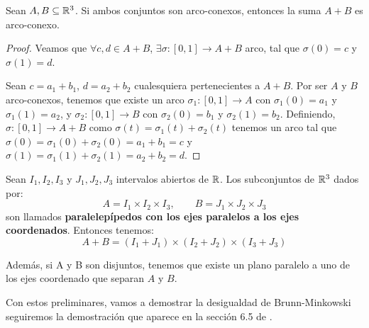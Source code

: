 \begin{lemma}
Sean $A,B \subseteq \mathbb{R}^3$. Si ambos conjuntos son arco-conexos, entonces la suma $A+B$ es arco-conexo.
\end{lemma}
\begin{proof}
Veamos que $\forall c,d \in A+B$, $\exists \sigma: [0,1] \longrightarrow A+B$ arco, tal que $\sigma(0)=c$ y $\sigma(1)=d$.

Sean $c=a_1 + b_1$, $d=a_2+b_2$ cualesquiera pertenecientes a $A+B$. Por ser $A$ y $B$ arco-conexos, tenemos que existe un arco $\sigma_1: [0,1] \longrightarrow A$ con $\sigma_1(0)=a_1$ y $\sigma_1(1)=a_2$, y $\sigma_2: [0,1] \longrightarrow B$ con $\sigma_2(0)=b_1$ y $\sigma_2(1)=b_2$. Definiendo, $\sigma: [0,1] \longrightarrow A+B$ como $\sigma(t) = \sigma_1(t) + \sigma_2(t)$ tenemos un arco tal que $\sigma(0)=\sigma_1(0) + \sigma_2(0) = a_1+b_1 = c$ y $\sigma(1)=\sigma_1(1) + \sigma_2(1) = a_2+b_2 = d$.
\end{proof}

\begin{lemma}\label{paralelepipedoslemma}
Sean $I_1, I_2, I_3$ y $J_1, J_2, J_3$ intervalos abiertos de $\mathbb{R}$. Los subconjuntos de $\mathbb{R}^3$ dados por:
%
\begin{equation*}
    A = I_1 \times I_2 \times I_3, \qquad B = J_1 \times J_2 \times J_3
\end{equation*}
%
son llamados \textbf{paralelepípedos con los ejes paralelos a los ejes coordenados}. Entonces tenemos:
%
\begin{equation*}
    A + B = (I_1 + J_1) \times (I_2 + J_2) \times (I_3 + J_3)
\end{equation*}

Además, si A y B son disjuntos, tenemos que existe un plano paralelo a uno de los ejes coordenado que separan $A$ y $B$.
\end{lemma}

Con estos preliminares, vamos a demostrar la desigualdad de Brunn-Minkowski seguiremos la demostración que aparece en la sección 6.5 de \cite{montielrosbook}.

